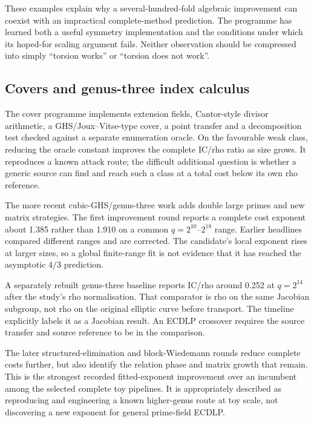 These examples explain why a several-hundred-fold algebraic improvement
can coexist with an impractical complete-method prediction. The
programme has learned both a useful symmetry implementation and the
conditions under which its hoped-for scaling argument fails. Neither
observation should be compressed into simply ``torsion works'' or
``torsion does not work''.

\subsection{Covers and genus-three index calculus}

The cover programme implements extension fields, Cantor-style divisor
arithmetic, a GHS/Joux--Vitse-type cover, a point transfer and a
decomposition test checked against a separate enumeration oracle.
On the favourable weak class, reducing the oracle constant improves the
complete IC/rho ratio as size grows. It reproduces a known attack route;
the difficult additional question is whether a generic source can find
and reach such a class at a total cost below its own rho reference.

The more recent cubic-GHS/genus-three work adds double large primes and
new matrix strategies. The first improvement round reports a complete
cost exponent about 1.385 rather than 1.910 on a common
$q=2^{10}$--$2^{18}$ range. Earlier headlines compared different ranges
and are corrected. The candidate's local exponent rises at larger
sizes, so a global finite-range fit is not evidence that it has reached
the asymptotic $4/3$ prediction.

A separately rebuilt genus-three baseline reports IC/rho around 0.252
at $q=2^{14}$ after the study's rho normalisation. That comparator is
rho on the same Jacobian subgroup, not rho on the original elliptic
curve before transport. The timeline explicitly labels it as a
Jacobian result. An ECDLP crossover requires the source transfer and
source reference to be in the comparison.

The later structured-elimination and block-Wiedemann rounds reduce
complete costs further, but also identify the relation phase and matrix
growth that remain. This is the strongest recorded fitted-exponent
improvement over an incumbent among the selected complete toy pipelines.
It is appropriately described as reproducing and engineering a known
higher-genus route at toy scale, not discovering a new exponent for
general prime-field ECDLP.

